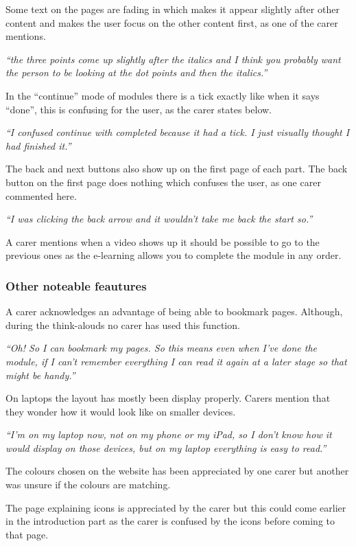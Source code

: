 \documentclass{sigchi}
\begin{document}
Some text on the pages are fading in which makes it appear slightly after other content and makes the user focus on the other content first, as one of the carer mentions.

\textit{“the three points come up slightly after the italics and I think you probably want the person to be looking at the dot points and then the italics.”}

In the “continue” mode of modules there is a tick exactly like when it says “done”, this is confusing for the user, as the carer states below. 

\textit{“I confused continue with completed because it had a tick. I just visually thought I had finished it.”}

The back and next buttons also show up on the first page of each part. The back button on the first page does nothing which confuses the user, as one carer commented here.

\textit{“I was clicking the back arrow and it wouldn't take me back the start so.”}

A carer mentions when a video shows up it should be possible to go to the previous ones as the e-learning allows you to complete the module in any order.

\subsubsection{Other noteable feautures}
A carer acknowledges an advantage of being able to bookmark pages. Although, during the think-alouds no carer has used this function. 

\textit{“Oh! So I can bookmark my pages. So this means even when I’ve done the module, if I can’t remember everything I can read it again at a later stage so that might be handy.”}

On laptops the layout has mostly been display properly. Carers mention that they wonder how it would look like on smaller devices. 

\textit{“I’m on my laptop now, not on my phone or my iPad, so I don’t know how it would display on those devices, but on my laptop everything is easy to read.”}

The colours chosen on the website has been appreciated by one carer but another was unsure if the colours are matching. 

The page explaining icons is appreciated by the carer but this could come earlier in the introduction part as the carer is confused by the icons before coming to that page.
\end{document}
